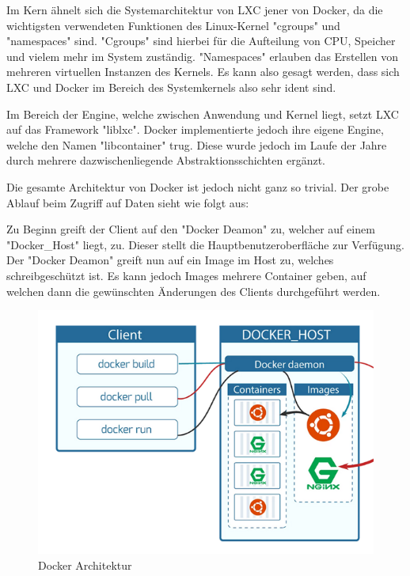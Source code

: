 

Im Kern ähnelt sich die Systemarchitektur von LXC jener von Docker, da die wichtigsten verwendeten Funktionen des Linux-Kernel "cgroups" und "namespaces" sind. "Cgroups" sind hierbei für die Aufteilung von CPU, Speicher und vielem mehr im System zuständig. "Namespaces" erlauben das Erstellen von mehreren virtuellen Instanzen des Kernels. Es kann also gesagt werden, dass sich LXC und Docker im Bereich des Systemkernels also sehr ident sind. \cite{LxcVsDocker}

Im Bereich der Engine, welche zwischen Anwendung und Kernel liegt, setzt LXC auf das Framework "liblxc". Docker implementierte jedoch ihre eigene Engine, welche den Namen "libcontainer" trug. Diese wurde jedoch im Laufe der Jahre durch mehrere dazwischenliegende Abstraktionsschichten ergänzt. \cite{LxcVsDocker}

Die gesamte Architektur von Docker ist jedoch nicht ganz so trivial. Der grobe Ablauf beim Zugriff auf Daten sieht wie folgt aus:

Zu Beginn greift der Client auf den "Docker Deamon" zu, welcher auf einem "Docker\_Host" liegt, zu. Dieser stellt die Hauptbenutzeroberfläche zur Verfügung. Der "Docker Deamon" greift nun auf ein Image im Host zu, welches schreibgeschützt ist. Es kann jedoch Images mehrere Container geben, auf welchen dann die gewünschten Änderungen des Clients durchgeführt werden. \cite{LxcVsDocker}

\begin{figure}[H]
    \centering
    \includegraphics{media/DockerAndContainering/DockerArchitektur.png}
    \caption{Docker Architektur \cite{LxcVsDocker}}
\end{figure}

